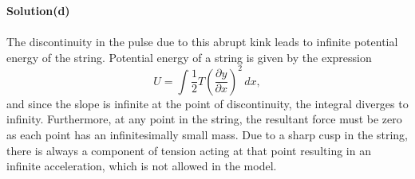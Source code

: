 \documentclass[12pt,a4paper]{article}
\begin{document}
\textbf{Solution(d)}
\\
\\The discontinuity in the pulse due to this abrupt kink leads to infinite potential energy of the string. Potential energy of a string is given by the expression
\begin{equation}
    U=\int\frac{1}{2}T\left(\frac{\partial y}{\partial x}\right)^2\,dx,
\end{equation}
and since the slope is infinite at the point of discontinuity, the integral diverges to infinity. Furthermore, at any point in the string, the resultant force must be zero as each point has an infinitesimally small mass. Due to a sharp cusp in the string, there is always a component of tension acting at that point resulting in an infinite acceleration, which is not allowed in the model.
\end{document}
